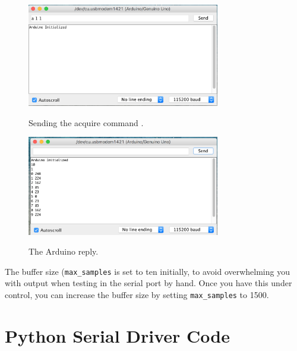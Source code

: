 \documentclass[12pt]{article}
\begin{document}
\begin{figure}[htbp]
\begin{center}
{\includegraphics[width=0.75\textwidth]{figs/send.png}}
\end{center}
\caption{\label{fig:send} Sending the acquire command .}
\end{figure}

\begin{figure}[htbp]
\begin{center}
{\includegraphics[width=0.75\textwidth]{figs/reply.png}}
\end{center}
\caption{\label{fig:reply} The Arduino reply.}
\end{figure}
The buffer size ({\tt max\_samples} is set to ten initially, to avoid overwhelming you with output when testing in the serial port by hand.  Once you have this under control, you can increase the buffer size by setting {\tt max\_samples} to 1500. 

\section{Python Serial Driver Code}
\end{document}
